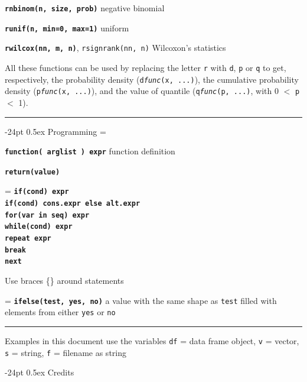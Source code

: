 \documentclass[8pt,landscape]{article}
\makeatletter
\renewcommand\section{\@startsection{section}{1}{0mm}%
                                     {-24pt}%
                                     {0.5ex}%
                                {\color{blue}\normalfont\large\bfseries}}
\newcommand{\code}{\texttt}
\newcommand{\bcode}[1]{\texttt{\textbf{#1}}}
\makeatother
\begin{document}
\begin{multicols*}{3}
\bcode{rnbinom(n, size, prob)} negative binomial  

\bcode{runif(n, min=0, max=1)} uniform  

\bcode{rwilcox(nn, m, n)}, \code{rsignrank(nn, n)} Wilcoxon's statistics  

All these functions can be used by replacing the letter \code{r} with
\code{d}, \code{p} or \code{q} to get, respectively, the probability
density (\code{d\textsl{func}(x, ...)}), the cumulative probability
density (\code{p\textsl{func}(x, ...)}), and the value of quantile
(\code{q\textsl{func}(p, ...)}, with 0 $<$ \code{p} $<$ 1).



\bigskip

\rule{.3\textwidth}{0.4pt}


\section{Programming}
\everypar={\hangindent=9mm}

\bcode{function( arglist ) expr} function definition

\bcode{return(value)}

\everypar={\hangindent=0mm}
\bcode{if(cond) expr\\
if(cond) cons.expr  else  alt.expr\\
for(var in seq) expr\\
while(cond) expr\\
repeat expr\\
break\\
next}

Use braces \{\} around statements


\everypar={\hangindent=9mm}
\bcode{ifelse(test, yes, no)} a value with the same shape as \code{test} filled with elements
from either \code{yes} or \code{no} 




  \bigskip
 
 \rule{0.3\textwidth}{0.4pt}

  
  Examples in this document use the variables \code{df} = data frame object, \code{v} = vector, \code{s} = string,  \code{f} = filename as string
  
  \bigskip
  
  \section{Credits}
  

\end{multicols*}
\end{document}
